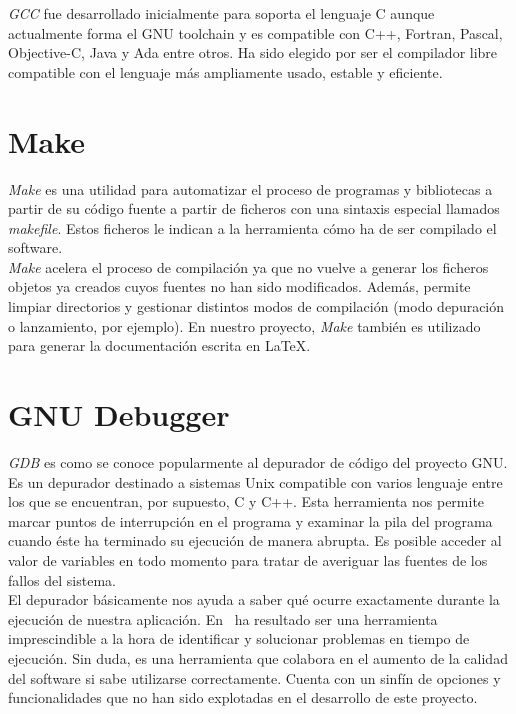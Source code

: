 \textit{GCC} fue desarrollado inicialmente para soporta el lenguaje
C aunque actualmente forma el GNU toolchain y es compatible con C++,
Fortran, Pascal, Objective-C, Java y Ada entre otros. Ha sido elegido
por ser el compilador libre compatible con el lenguaje más ampliamente
usado, estable y eficiente.\\

\section*{Make}

\textit{Make} \cite{pdf:make} es una utilidad para automatizar el proceso
de programas y bibliotecas a partir de su código fuente a partir
de ficheros con una sintaxis especial llamados \textit{makefile}. Estos
ficheros le indican a la herramienta cómo ha de ser compilado el software.\\

\textit{Make} acelera el proceso de compilación ya que no vuelve a generar
los ficheros objetos ya creados cuyos fuentes no han sido modificados. Además,
permite limpiar directorios y gestionar distintos modos de compilación
(modo depuración o lanzamiento, por ejemplo). En nuestro proyecto, \textit{Make}
también es utilizado para generar la documentación escrita en \LaTeX.\\

\section*{GNU Debugger}

\textit{GDB} \cite{website:gdb} es como se conoce popularmente al depurador de código del
proyecto GNU. Es un depurador destinado a sistemas Unix compatible con varios
lenguaje entre los que se encuentran, por supuesto, C y C++. Esta herramienta
nos permite marcar puntos de interrupción en el programa y examinar la pila
del programa cuando éste ha terminado su ejecución de manera abrupta. Es
posible acceder al valor de variables en todo momento para tratar de averiguar
las fuentes de los fallos del sistema.\\

El depurador básicamente nos ayuda a saber qué ocurre exactamente durante
la ejecución de nuestra aplicación. En \juego\ ha resultado ser una herramienta
imprescindible a la hora de identificar y solucionar problemas en tiempo
de ejecución. Sin duda, es una herramienta que colabora en el aumento de
la calidad del software si sabe utilizarse correctamente. Cuenta con un
sinfín de opciones y funcionalidades que no han sido explotadas en el
desarrollo de este proyecto.\\


